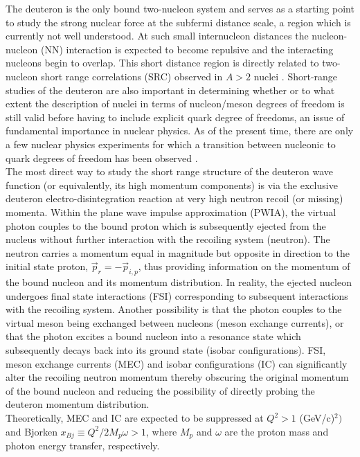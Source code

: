 The deuteron is the only bound two-nucleon  system and serves as a starting point to study the strong nuclear force at the subfermi distance scale, a region which is currently
not well understood. At such small internucleon distances the nucleon-nucleon (NN) interaction is expected to become repulsive and the interacting
nucleons begin to overlap. 
This short distance region is directly related to two-nucleon short range correlations (SRC) observed in $A>2$ nuclei \cite{PhysRevC.68.014313,PhysRevLett.96.082501,PhysRevLett.99.072501,Fomin_2017}.
Short-range studies of the deuteron are also important in determining whether or to what extent the description of nuclei in terms of nucleon/meson degrees of freedom is still valid before
having to include explicit quark degree of freedoms, an issue of fundamental importance in nuclear physics\cite{sargsian_2015}. As of the present time, there are only a few nuclear physics experiments for
which a transition between nucleonic to quark degrees of freedom has been observed \cite{PhysRevLett.81.4576,PhysRevLett.87.102302,PhysRevC.66.042201}. \\
\indent The most direct way to study the short range structure of the deuteron wave function (or equivalently, its high momentum components) is via the exclusive deuteron
electro-disintegration reaction at very high neutron recoil (or missing) momenta. Within the plane wave impulse approximation (PWIA), the virtual photon couples to
the bound proton which is subsequently ejected from the nucleus without further interaction with the recoiling system (neutron). The neutron carries a momentum equal in magnitude but opposite in direction
to the initial state proton, $\vec{p}_{r} = -\vec{p}_{i,p}$, thus providing information on the momentum of the bound nucleon and its momentum distribution. 
In reality, the ejected nucleon undergoes final state interactions (FSI) corresponding to subsequent interactions with the recoiling system. Another possibility is that the
photon couples to the virtual meson being exchanged between nucleons (meson exchange currents), or that the photon excites a bound nucleon into a resonance state which subsequently
decays back into its ground state (isobar configurations).  FSI, meson exchange currents (MEC) and isobar configurations (IC)  can significantly alter the recoiling neutron
momentum thereby obscuring the original momentum of the bound nucleon and reducing the possibility of directly probing the deuteron momentum distribution. \\
\indent Theoretically, MEC and IC are expected to be suppressed at $Q^{2}>1$ (GeV/c)$^{2})$ and Bjorken $x_{Bj}\equiv Q^{2}/2M_{p}\omega>1$, where $M_{p}$ and $\omega$ are the proton mass and photon energy transfer, respectively.
